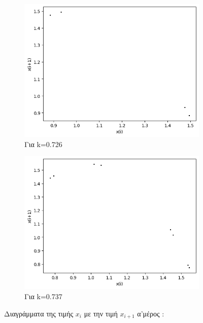 \begin{figure}[h!]
\begin{subfigure}[b]{0.4\textwidth}
		\includegraphics[width=\textwidth]{LateX images/graphs q14/g15}
		\caption{Για k=0.726}
		\label{f:k72}
	\end{subfigure}
	\hfill
	\begin{subfigure}[b]{0.4\textwidth}
		\centering
		\includegraphics[width=\textwidth]{LateX images/graphs q14/g16}
		\caption{Για k=0.737}
		\label{f:k73}
	\end{subfigure}
	\hfill
	\caption{Διαγράμματα της τιμής \(x_i\) με την τιμή \(x_{i+1}\) α'μέρος :}
\end{figure}
